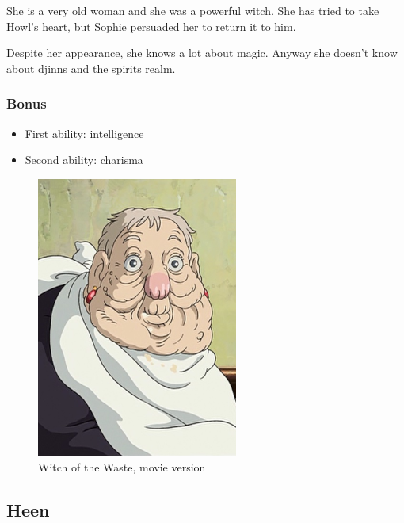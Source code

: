 \begin{minipage}[t]{0.5\textwidth}
She is a very old woman and she was a powerful witch. She has tried to take Howl’s heart, but Sophie persuaded her to return it to him.

Despite her appearance, she knows a lot about magic. Anyway she doesn’t know about djinns and the spirits realm.

\subsubsection{Bonus}
\begin{itemize}
	\item First ability: intelligence
	\item Second ability: charisma
\end{itemize}

\end{minipage}%
%
\hfill
\begin{minipage}[t]{0.4\textwidth}
  \begin{figure}[H]
    \hfill\includegraphics{Images/Characters/witchOfTheWaste_portrait}
    \caption{Witch of the Waste, movie version}
  \end{figure}
\end{minipage}

\subsection{Heen}

